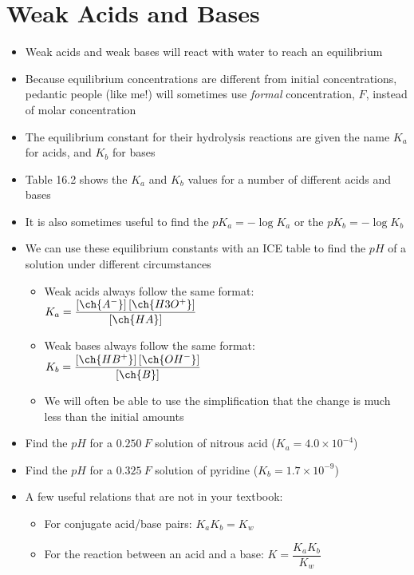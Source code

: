 \documentclass[12pt, openany, letterpaper]{memoir}
\begin{document}
\section{Weak Acids and Bases}
\begin{itemize}
	\item Weak acids and weak bases will react with water to reach an equilibrium
	\item Because equilibrium concentrations are different from initial concentrations, pedantic people (like me!) will sometimes use \emph{formal} concentration, $F$, instead of molar concentration
	\item The equilibrium constant for their hydrolysis reactions are given the name $K_a$ for acids, and $K_b$ for bases
	\item Table 16.2 shows the $K_a$ and $K_b$ values for a number of different acids and bases
	\item It is also sometimes useful to find the $pK_a = -\log K_a$ or the $pK_b=-\log K_b$
	\item We can use these equilibrium constants with an ICE table to find the $pH$ of a solution under different circumstances
	\begin{itemize}
		\item Weak acids always follow the same format: $K_a=\dfrac{\left[\ch{A^-}\right]\left[\ch{H3O^+}\right]}{\left[\ch{HA}\right]}$
		\item Weak bases always follow the same format: $K_b=\dfrac{\left[\ch{HB^+}\right]\left[\ch{OH^-}\right]}{\left[\ch{B}\right]}$
		\item We will often be able to use the simplification that the change is much less than the initial amounts
	\end{itemize}
	\item Find the $pH$ for a $0.250~F$ solution of nitrous acid ($K_a=4.0\times10^{-4}$)
	\item Find the $pH$ for a $0.325~F$ solution of pyridine ($K_b=1.7\times10^{-9}$)
	\item A few useful relations that are not in your textbook:
	\begin{itemize}
		\item For conjugate acid/base pairs: $K_aK_b=K_w$
		\item For the reaction between an acid and a base: $K=\dfrac{K_aK_b}{K_w}$
	\end{itemize}
\end{itemize}
\end{document}
